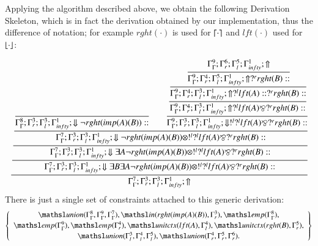 \documentclass[a4paper,10pt]{article}
\newcommand{\elin}[2]{\ensuremath{{\tsl{unitctx}(\ensuremath{#1}, \ensuremath{#2})}}}
\newcommand{\emp}[1]{\ensuremath{{\tsl{emp}(\ensuremath{#1})}}}
\newcommand{\union}[3]{\ensuremath{{\tsl{union}(\ensuremath{#1},\ensuremath{#2},\ensuremath{ #3})}}}
\newcommand{\In}[2]{\ensuremath{\tsl{in}(\ensuremath{#1},\ensuremath{#2})}}
\begin{document}
Applying the algorithm described above, we obtain the following Derivation Skeleton, which is in fact the 
derivation obtained by our implementation, thus the difference of notation; for example $rght(\cdot)$ is used for
$\lceil \cdot \rceil$ and $lft(\cdot)$ used for $\lfloor \cdot \rfloor$:

{\small
\[
\cfrac{\cfrac{\cfrac{\cfrac{\cfrac{}
{\Gamma_{ \Gamma}^{8} ; \Gamma_{r}^{3} ; \Gamma_{l}^{3} ; \Gamma_{ infty}^{1} ;  \Downarrow \neg rght (imp (A) (B) )  :: }
\qquad
\cfrac{\cfrac{\cfrac{\cfrac{\Gamma_{ \Gamma}^{9} ; \Gamma_{r}^{6} ; \Gamma_{l}^{5} ; \Gamma_{ infty}^{1} ;  \Uparrow }
{\Gamma_{ \Gamma}^{9} ; \Gamma_{r}^{4} ; \Gamma_{l}^{5} ; \Gamma_{ infty}^{1} ;  \Uparrow  ?^{r} rght (B)  :: }}
{\Gamma_{ \Gamma}^{9} ; \Gamma_{r}^{4} ; \Gamma_{l}^{3} ; \Gamma_{ infty}^{1} ;  \Uparrow  ?^{l} lft (A)  ::  ?^{r} rght (B)  :: }}
{\Gamma_{ \Gamma}^{9} ; \Gamma_{r}^{4} ; \Gamma_{l}^{3} ; \Gamma_{ infty}^{1} ;  \Uparrow  ?^{l} lft (A)  \bindnasrepma  ?^{r} rght (B)  :: }}
{\Gamma_{ \Gamma}^{9} ; \Gamma_{r}^{3} ; \Gamma_{l}^{3} ; \Gamma_{ infty}^{1} ;  \Downarrow  !^{l}  ?^{l} lft (A)  \bindnasrepma  ?^{r} rght (B)  :: }}
{\Gamma_{ \Gamma}^{7} ; \Gamma_{r}^{3} ; \Gamma_{l}^{3} ; \Gamma_{ infty}^{1} ;  \Downarrow \neg rght (imp (A) (B) )  \otimes  !^{l}  ?^{l} lft (A)  \bindnasrepma  ?^{r} rght (B)  :: }}
{\Gamma_{ \Gamma}^{7} ; \Gamma_{r}^{3} ; \Gamma_{l}^{3} ; \Gamma_{ infty}^{1} ;  \Downarrow \exists A \neg rght (imp (A) (B) )  \otimes  !^{l}  ?^{l} lft (A)  \bindnasrepma  ?^{r} rght (B)  :: }}
{\Gamma_{ \Gamma}^{7} ; \Gamma_{r}^{3} ; \Gamma_{l}^{3} ; \Gamma_{ infty}^{1} ;  \Downarrow \exists B \exists A \neg rght (imp (A) (B) )  \otimes  !^{l}  ?^{l} lft (A)  \bindnasrepma  ?^{r} rght (B)  :: }}
{\Gamma_{ \Gamma}^{7} ; \Gamma_{r}^{3} ; \Gamma_{l}^{3} ; \Gamma_{ infty}^{1} ;  \Uparrow }
\]
}
There is just a single set of constraints attached to this generic derivation:
\[
 \left\{\begin{array}{c}
  \union{\Gamma_{ \Gamma}^{8}}{\Gamma_{ \Gamma}^{9}}{\Gamma_{ \Gamma}^{7}}, \In{rght (imp (A) (B)) }{ \Gamma_{r}^{3}}, 
  \emp{\Gamma_{ \Gamma}^{8}},\\[2pt]
  \emp{\Gamma_{ \Gamma}^{9}}, \emp{\Gamma_{r}^{4}},\elin{lft (A)}{ \Gamma_{l}^{4}},
  \elin{rght (B)}{ \Gamma_{r}^{5}},\\[2pt]
  \union{\Gamma_{l}^{3}} {\Gamma_{l}^{4}} {\Gamma_{l}^{5}},\union{\Gamma_{r}^{4}}{\Gamma_{r}^{5} } {\Gamma_{r}^{6}}.
 \end{array}\right\}
\]
\end{document}
